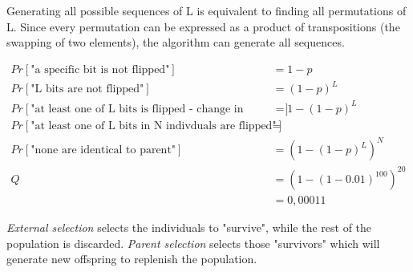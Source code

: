 \documentclass[10pt,a4paper,boxed]{hmcpset}
\begin{document}
\begin{problem}[Assignment 46]
\end{problem}
\begin{solution}
Generating all possible sequences of L is equivalent to finding all permutations of L. Since every permutation can be expressed as a product of transpositions (the swapping of two elements), the algorithm can generate all sequences.
\end{solution}

\begin{problem}[Assignment 47]
\end{problem}
\begin{solution}
\begin{align*}
	Pr[\mbox{"a specific bit is not flipped"}] & = 1-p \\
	Pr[\mbox{"L bits are not flipped"}] & = (1-p)^L \\
	Pr[\mbox{"at least one of L bits is flipped - change in genome"}] & = 1-(1-p)^{L} \\
	Pr[\mbox{"at least one of L bits in N indivduals are flipped"}] & = \\
	Pr[\mbox{"none are identical to parent"}] & = (1 - (1-p)^{L})^N \\
	Q & = (1-(1-0.01)^{100})^{20} \\
	  & = 0,00011
\end{align*}
\end{solution}

\begin{problem}[Assignment 48]
\end{problem}
\begin{solution}
\emph{External selection} selects the individuals to "survive", while the rest of the population is discarded. \emph{Parent selection} selects those "survivors" which will generate new offspring to replenish the population.
\end{solution}
\end{document}
